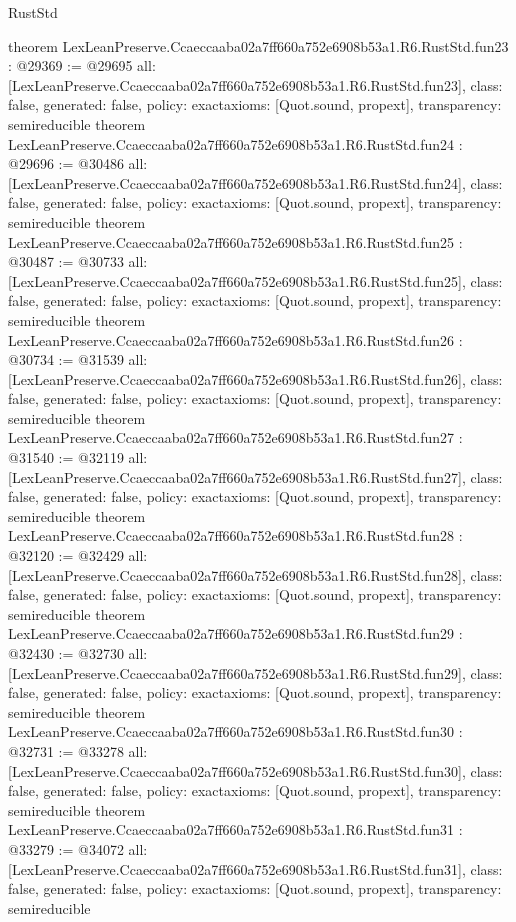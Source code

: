 \begin{lexlean}{RustStd}
\begin{coremodule}
{}
theorem LexLeanPreserve.Ccaeccaaba02a7ff660a752e6908b53a1.R6.RustStd.fun23 : @29369 := @29695 {
  all: [LexLeanPreserve.Ccaeccaaba02a7ff660a752e6908b53a1.R6.RustStd.fun23],
  class: false,
  generated: false,
  policy: exact{axioms: [Quot.sound, propext]},
  transparency: semireducible
}
theorem LexLeanPreserve.Ccaeccaaba02a7ff660a752e6908b53a1.R6.RustStd.fun24 : @29696 := @30486 {
  all: [LexLeanPreserve.Ccaeccaaba02a7ff660a752e6908b53a1.R6.RustStd.fun24],
  class: false,
  generated: false,
  policy: exact{axioms: [Quot.sound, propext]},
  transparency: semireducible
}
theorem LexLeanPreserve.Ccaeccaaba02a7ff660a752e6908b53a1.R6.RustStd.fun25 : @30487 := @30733 {
  all: [LexLeanPreserve.Ccaeccaaba02a7ff660a752e6908b53a1.R6.RustStd.fun25],
  class: false,
  generated: false,
  policy: exact{axioms: [Quot.sound, propext]},
  transparency: semireducible
}
theorem LexLeanPreserve.Ccaeccaaba02a7ff660a752e6908b53a1.R6.RustStd.fun26 : @30734 := @31539 {
  all: [LexLeanPreserve.Ccaeccaaba02a7ff660a752e6908b53a1.R6.RustStd.fun26],
  class: false,
  generated: false,
  policy: exact{axioms: [Quot.sound, propext]},
  transparency: semireducible
}
theorem LexLeanPreserve.Ccaeccaaba02a7ff660a752e6908b53a1.R6.RustStd.fun27 : @31540 := @32119 {
  all: [LexLeanPreserve.Ccaeccaaba02a7ff660a752e6908b53a1.R6.RustStd.fun27],
  class: false,
  generated: false,
  policy: exact{axioms: [Quot.sound, propext]},
  transparency: semireducible
}
theorem LexLeanPreserve.Ccaeccaaba02a7ff660a752e6908b53a1.R6.RustStd.fun28 : @32120 := @32429 {
  all: [LexLeanPreserve.Ccaeccaaba02a7ff660a752e6908b53a1.R6.RustStd.fun28],
  class: false,
  generated: false,
  policy: exact{axioms: [Quot.sound, propext]},
  transparency: semireducible
}
theorem LexLeanPreserve.Ccaeccaaba02a7ff660a752e6908b53a1.R6.RustStd.fun29 : @32430 := @32730 {
  all: [LexLeanPreserve.Ccaeccaaba02a7ff660a752e6908b53a1.R6.RustStd.fun29],
  class: false,
  generated: false,
  policy: exact{axioms: [Quot.sound, propext]},
  transparency: semireducible
}
theorem LexLeanPreserve.Ccaeccaaba02a7ff660a752e6908b53a1.R6.RustStd.fun30 : @32731 := @33278 {
  all: [LexLeanPreserve.Ccaeccaaba02a7ff660a752e6908b53a1.R6.RustStd.fun30],
  class: false,
  generated: false,
  policy: exact{axioms: [Quot.sound, propext]},
  transparency: semireducible
}
theorem LexLeanPreserve.Ccaeccaaba02a7ff660a752e6908b53a1.R6.RustStd.fun31 : @33279 := @34072 {
  all: [LexLeanPreserve.Ccaeccaaba02a7ff660a752e6908b53a1.R6.RustStd.fun31],
  class: false,
  generated: false,
  policy: exact{axioms: [Quot.sound, propext]},
  transparency: semireducible
}
\end{coremodule}
\end{lexlean}
